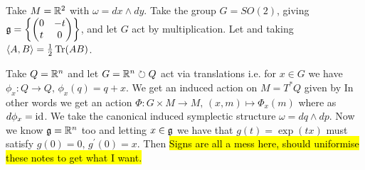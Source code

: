 \documentclass{article}
\begin{document}
\begin{example}
Take $M = \mathbb{R}^2$ with $ \omega = dx \wedge dy$. Take the group $G = SO(2)$, giving $\mathfrak{g} = \left\{ \begin{pmatrix} 0 & -t \\ t & 0 \end{pmatrix} \right\}$, and let $G$ act by multiplication. Let 
and 
taking $\left\langle A,B \right\rangle = \frac{1}{2}\operatorname{Tr}(AB)$. 
\end{example}

\begin{example}
Take $Q = \mathbb{R}^n$ and let $G = \mathbb{R}^n \circlearrowright Q$ act via translations i.e. for $x \in G$ we have $\phi_x:Q \to Q, \, \phi_x(q) = q+x$. We get an induced action on $M = T^\ast Q$ given by 
In other words we get an action $\Phi : G \times M \to M, \, (x,m) \mapsto \Phi_x(m)$ where 
as $d\phi_x = \operatorname{id}$. We take the canonical induced symplectic structure $\omega = dq \wedge dp$. Now we know $\mathfrak{g} = \mathbb{R}^n$ too and letting $x \in \mathfrak{g}$ we have that $g(t) = \exp(tx)$ must satisfy $g(0)=0,\, g^\prime(0)=x$. Then
\hl{Signs are all a mess here, should uniformise these notes to get what I want. }
\end{example}
\end{document}
